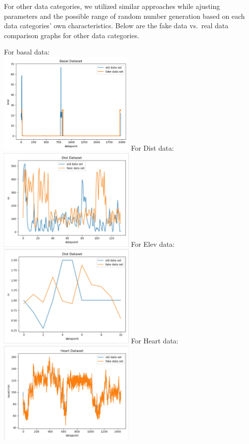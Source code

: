 \documentclass[]{book}
\begin{document}
For other data categories, we utilized similar approaches while ajusting parameters and the possible range of random number generation based on each data categories' own characteristics. Below are the fake data vs.~real data comparison graphs for other data categories.

For basal data:\\
\includegraphics[width=0.5\textwidth,height=\textheight]{./images/BasalData.png}
For Dist data:\\
\includegraphics[width=0.5\textwidth,height=\textheight]{./images/Dist Data.JPG}
For Elev data:\\
\includegraphics[width=0.5\textwidth,height=\textheight]{./images/Elev Data.JPG}
For Heart data:\\
\includegraphics[width=0.5\textwidth,height=\textheight]{./images/Heart Data.JPG}
\end{document}
